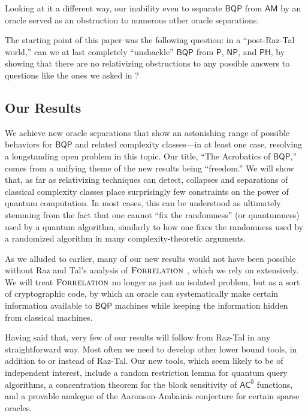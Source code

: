 \documentclass[11pt]{article}%
\newcommand{\Forrelation}{\normalfont\textsc{Forrelation}}
\begin{document}
Looking at it a different way, our inability even to separate $\mathsf{BQP}$ from $\mathsf{AM}$ by an oracle served as an obstruction to numerous other oracle separations.

The starting point of this paper was the following question: in a ``post-Raz-Tal world,'' can we at last completely ``unshackle'' $\mathsf{BQP}$ from $\mathsf{P}$, $\mathsf{NP}$, and $\mathsf{PH}$, by showing that there are no relativizing obstructions to any possible answers to questions like the ones we asked in ?

\subsection{Our Results}
\label{sec:results}
We achieve new oracle separations that show an astonishing range of possible behaviors for $\mathsf{BQP}$ and related complexity classes---in at least one case, resolving a longstanding open problem in this topic.  Our title, ``The Acrobatics of $\mathsf{BQP}$,'' comes from a unifying theme of the new results being ``freedom.'' We will show that, as far as relativizing techniques can detect, collapses and separations of classical complexity classes place surprisingly few constraints on the power of quantum computation. In most cases, this can be understood as ultimately stemming from the fact that one cannot ``fix the randomness'' (or quantumness) used by a quantum algorithm, similarly to how one fixes the randomness used by a randomized algorithm in many complexity-theoretic arguments.

As we alluded to earlier, many of our new results would not have been possible without Raz and Tal's analysis of $\Forrelation$ \cite{RT19}, which we rely on extensively.  We will treat $\Forrelation$ no longer as just an isolated problem, but as a sort of cryptographic code, by which an oracle can systematically make certain information available to $\mathsf{BQP}$ machines while keeping the information hidden from classical machines.

Having said that, very few of our results will follow from Raz-Tal in any straightforward way.  Most often we need to develop other lower bound tools, in addition to or instead of Raz-Tal.  Our new tools, which seem likely to be of independent interest, include a random restriction lemma for quantum query algorithms, a concentration theorem for the block sensitivity of $\mathsf{AC^0}$ functions, and a provable analogue of the Aaronson-Ambainis conjecture \cite{AA14} for certain sparse oracles.
\end{document}
